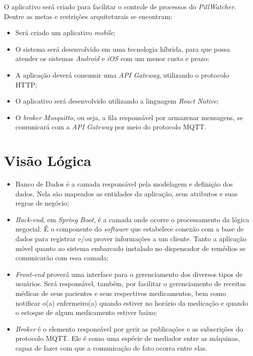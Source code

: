 \begin{apendicesenv}
O aplicativo será criado para facilitar o controle de processos do \textit{PillWatcher}.
Dentre as metas e restrições arquiteturais se encontram:

\begin{itemize}
    \item Será criado um aplicativo \textit{mobile};
    \item O sistema será desenvolvido em uma tecnologia híbrida, para que possa atender os sistemas \textit{Android} e \textit{iOS} com um menor custo e prazo;
        \item A aplicação deverá consumir uma \textit{API Gateway}, utilizando o protocolo HTTP;
    \item O aplicativo será desenvolvido utilizando a linguagem \textit{React Native};
    \item O \emph{broker} \textit{Mosquitto}, ou seja, a fila responsável por armazenar mensagens, se comunicará com a \textit{API Gateway} por meio do protocolo MQTT.
\end{itemize}

\section{Visão Lógica}

\begin{itemize}
    \item Banco de Dados é a camada responsável pela modelagem e definição dos dados. Nela são mapeados as entidades da aplicação, seus atributos e suas regras de negócio;
    \item \textit{Back-end}, em \textit{Spring Boot}, é a camada onde ocorre o processamento da lógica negocial. É o componente do \textit{software} que estabelece conexão com a base de dados para registrar e/ou prover informações a um cliente. Tanto a aplicação móvel quanto ao sistema embarcado instalado no dispensador de remédios se comunicarão com essa camada;
    \item \textit{Front-end} proverá uma interface para o gerenciamento dos diversos tipos de usuários. Será responsável, também, por facilitar o gerenciamento de receitas médicas de seus pacientes e seus respectivos medicamentos, bem como notificar o(a) enfermeiro(a) quando estiver no horário da medicação e quando o estoque de algum medicamento estiver baixo;
    \item \textit{Broker} é o elemento responsável por gerir as publicações e as subscrições do protocolo MQTT. Ele é como uma espécie de mediador entre as máquinas, capaz de fazer com que a comunicação de fato ocorra entre elas.
\end{itemize}


\end{apendicesenv}
